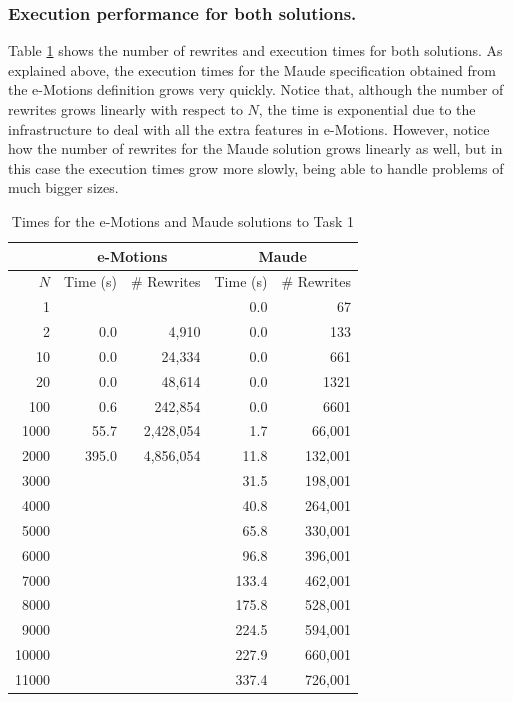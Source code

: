 \subsubsection{Execution performance for both solutions.}

Table \ref{table:task1} shows the number of rewrites and execution times for both solutions. As explained above, the execution times for the Maude specification obtained from the e-Motions definition grows very quickly. Notice that, although the number of rewrites grows linearly with respect to $N$, the time is exponential due to the infrastructure to deal with all the extra features in e-Motions. However, notice how the number of rewrites for the Maude solution grows linearly as well, but in this case the execution times grow more slowly, being able to handle problems of much bigger sizes.

\begin{table}[tb]
\renewcommand{\tabcolsep}{6pt}
\renewcommand{\arraystretch}{1.2}
    \centering
	\begin{tabular}[tb]{r|r|r|r|r|}
	    & \multicolumn{2}{|c|}{e-Motions} & \multicolumn{2}{|c|}{Maude} \\
	\hline
	$N$ & Time (s) & \# Rewrites & Time (s) & \# Rewrites \\
	\hline
	1    &       &           & 0.0 &       67 \\
	2    &   0.0 &     4,910 & 0.0 &      133 \\ 
	10   &   0.0 &    24,334 & 0.0 &      661 \\
	20   &   0.0 &    48,614 & 0.0 &     1321 \\
	100  &   0.6 &   242,854 & 0.0 &     6601 \\
	1000 &  55.7 & 2,428,054 & 1.7 &  66,001 \\
	2000 & 395.0 & 4,856,054 & 11.8 & 132,001 \\
	3000 &       &           & 31.5 & 198,001 \\
	4000 &       &           & 40.8 & 264,001 \\
	5000 &       &           & 65.8 & 330,001 \\
	6000 &       &           & 96.8 & 396,001 \\
	7000 &       &           & 133.4 & 462,001 \\
	8000 &       &           & 175.8 & 528,001 \\
	9000 &       &           & 224.5 & 594,001 \\
  10000 &      &           & 227.9 & 660,001 \\
  11000 &      &           & 337.4 & 726,001 \\
	\end{tabular}
	\vspace{.5cm}
	\caption{Times for the e-Motions and Maude solutions to Task 1}
	\label{table:task1}
\end{table}


